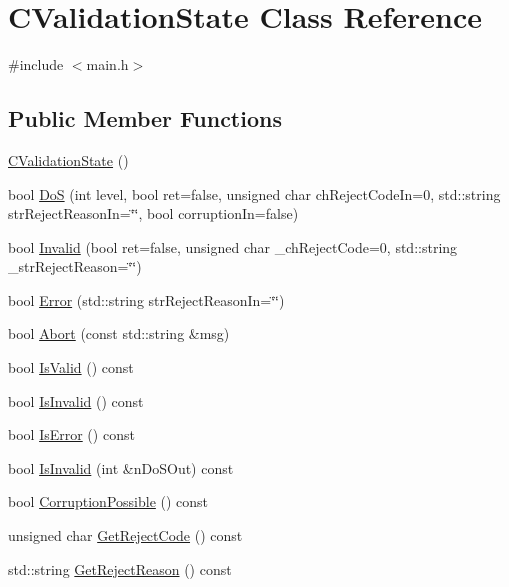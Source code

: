 \hypertarget{class_c_validation_state}{}\section{C\+Validation\+State Class Reference}
\label{class_c_validation_state}


{\ttfamily \#include $<$main.\+h$>$}

\subsection*{Public Member Functions}
\begin{DoxyCompactItemize}
\item 
\hyperlink{class_c_validation_state_a4c89cdea0b8e6983baa531bc756d8584}{C\+Validation\+State} ()
\item 
bool \hyperlink{class_c_validation_state_a3c6786d00da8d1c5df25b4c3876409e8}{Do\+S} (int level, bool ret=false, unsigned char ch\+Reject\+Code\+In=0, std\+::string str\+Reject\+Reason\+In=\char`\"{}\char`\"{}, bool corruption\+In=false)
\item 
bool \hyperlink{class_c_validation_state_a88ff08b67f7f44bb3c7f7053bb1ee6fc}{Invalid} (bool ret=false, unsigned char \+\_\+ch\+Reject\+Code=0, std\+::string \+\_\+str\+Reject\+Reason=\char`\"{}\char`\"{})
\item 
bool \hyperlink{class_c_validation_state_abf67ad56f62df5679d47c289684c554c}{Error} (std\+::string str\+Reject\+Reason\+In=\char`\"{}\char`\"{})
\item 
bool \hyperlink{class_c_validation_state_a6788cb521cf538ac80413a1c6c3da5e8}{Abort} (const std\+::string \&msg)
\item 
bool \hyperlink{class_c_validation_state_af4c51946b39b2234b8004d58fbc164a5}{Is\+Valid} () const 
\item 
bool \hyperlink{class_c_validation_state_aba47277dbc39192208515fd8cc685879}{Is\+Invalid} () const 
\item 
bool \hyperlink{class_c_validation_state_a8c608ada2395e5af099661ff353dbb3f}{Is\+Error} () const 
\item 
bool \hyperlink{class_c_validation_state_aba30a9e05436871a43e6acfb8e484963}{Is\+Invalid} (int \&n\+Do\+S\+Out) const 
\item 
bool \hyperlink{class_c_validation_state_a5b09f68e838c43ef20af29e725920a01}{Corruption\+Possible} () const 
\item 
unsigned char \hyperlink{class_c_validation_state_a8bbd27130d1810d60735e1df5e4ea69b}{Get\+Reject\+Code} () const 
\item 
std\+::string \hyperlink{class_c_validation_state_a2e7ea577adfdf90aaff44ad0fa16adde}{Get\+Reject\+Reason} () const 
\end{DoxyCompactItemize}


